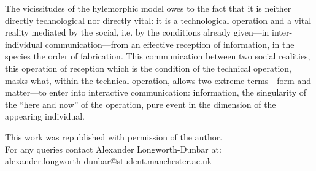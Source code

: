 \documentclass[a4paper]{article}
\begin{document}
The vicissitudes of the hylemorphic model owes to the fact that it is neither directly technological nor directly vital: it is a technological operation and a vital reality mediated by the social, i.e. by the conditions already given—in inter-individual communication—from an effective reception of information, in the species the order of fabrication. This communication between two social realities, this operation of reception which is the condition of the technical operation, masks what, within the technical operation, allows two extreme terms—form and matter—to enter into interactive communication: information, the singularity of the “here and now” of the operation, pure event in the dimension of the appearing individual.


\newpage

\vspace*{\fill}

\begin{center}

This work was republished with permission of the author.\\
[1\baselineskip]
For any queries contact Alexander Longworth-Dunbar at:\\ \href{mailto:alexander.longworth-dunbar@student.manchester.ac.uk}{alexander.longworth-dunbar@student.manchester.ac.uk}

\end{center}
\end{document}
